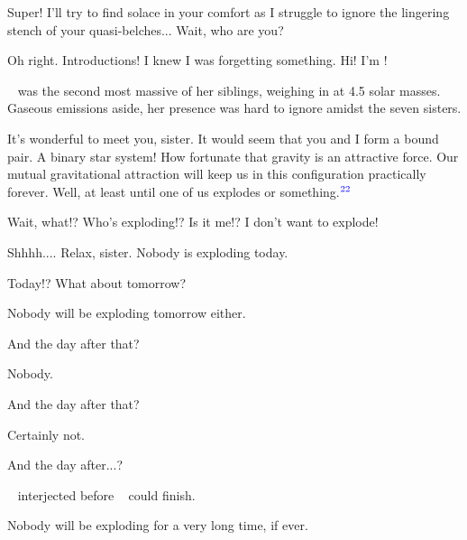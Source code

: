 \documentclass[main.tex]{subfiles}
\begin{document}
\par \Sterope Super!  I'll try to find solace in your comfort as I struggle to ignore the lingering stench of your quasi-belches...  Wait, who are you?

\par \Merope Oh right.  Introductions! I knew I was forgetting something.   Hi!  I'm \rmmerope!

\par \rmmerope~ was the second most massive of her siblings, weighing in at 4.5 solar masses.  Gaseous emissions aside, her presence was hard to ignore amidst the seven sisters.  

\par \Maia It's wonderful to meet you, sister.  It would seem that you and I form a bound pair.  A binary star system!  How fortunate that gravity is an attractive force.  Our mutual gravitational attraction will keep us in this configuration practically forever.  Well, at least until one of us explodes or something.$^{\textcolor{blue}{22}}$

\par \Merope Wait, what!?  Who's exploding!?  Is it me!?  I don't want to explode!

\par \Maia Shhhh....  Relax, sister.  Nobody is exploding today.  

\par \Merope Today!?  What about tomorrow?  

\par \Maia Nobody will be exploding tomorrow either.

\par \Merope And the day after that?

\par \Maia Nobody.

\par \Merope And the day after that?

\par \Maia Certainly not.

\par \Merope And the day after...?

\par \nar \rmmaia~ interjected before \rmmerope~ could finish.

\par \Maia Nobody will be exploding for a very long time, if ever.
\end{document}
